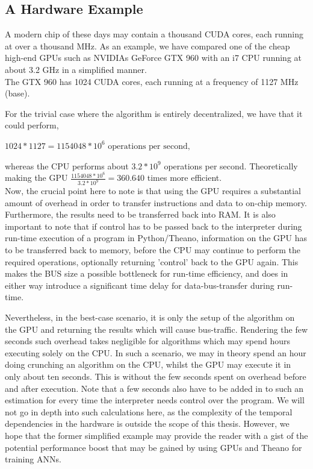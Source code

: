 \subsection{A Hardware Example}
A modern chip of these days may contain a thousand CUDA cores, each running at over a thousand MHz. As an example, we have compared one of the cheap high-end GPUs such as NVIDIAs GeForce GTX 960 with an i7 CPU running at about 3.2 GHz in a simplified manner.
\\
The GTX 960 has 1024 CUDA cores, each running at a frequency of 1127 MHz (base).

For the trivial case where the algorithm is entirely decentralized, we have that it could perform,

\begin{center}
\begin{math}
    1024 * 1127 = 1 154 048 * 10^6 \text{ operations per second},
\end{math}
\end{center}
whereas the CPU performs about $3.2 * 10^9$ operations per second.
Theoretically making the GPU $\frac{1154048*10^6}{3.2*10^9} = 360.640$ times more efficient.
\\
Now, the crucial point here to note is that using the GPU requires a substantial amount of overhead in order to transfer instructions and data to on-chip memory. Furthermore, the results need to be transferred back into RAM. It is also important to note that if control has to be passed back to the interpreter during run-time execution of a program in Python/Theano, information on the GPU has to be transferred back to memory, before the CPU may continue to perform the required operations, optionally returning 'control' back to the GPU again. This makes the BUS size a possible bottleneck for run-time efficiency, and does in either way introduce a significant time delay for data-bus-transfer during run-time.

Nevertheless, in the best-case scenario, it is only the setup of the algorithm on the GPU and returning the results which will cause bus-traffic. Rendering the few seconds such overhead takes negligible for algorithms which may spend hours executing solely on the CPU. In such a scenario, we may in theory spend an hour doing crunching an algorithm on the CPU, whilst the GPU may execute it in only about ten seconds. This is without the few seconds spent on overhead before and after execution. Note that a few seconds also have to be added in to such an estimation for every time the interpreter needs control over the program. We will not go in depth into such calculations here, as the complexity of the temporal dependencies in the hardware is outside the scope of this thesis. However, we hope that the former simplified example may provide the reader with a gist of the potential performance boost that may be gained by using GPUs and Theano for training ANNs.

